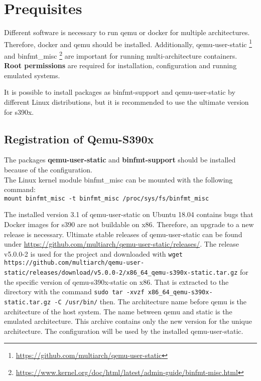 \chapter{Prequisites}\label{ch:prequisites}


Different software is necessary to run qemu or docker for multiple architectures. Therefore, docker and qemu should be installed. Additionally, qemu-user-static \footnote{\url{https://github.com/multiarch/qemu-user-static}} and binfmt\_misc \footnote{\url{https://www.kernel.org/doc/html/latest/admin-guide/binfmt-misc.html}} are important for running multi-architecture containers. \\
\textbf{Root permissions} are required for installation, configuration and running emulated systems.

It is possible to install packages as binfmt-support and qemu-user-static by different Linux distributions, but it is recommended to use the ultimate version for s390x. \\

\section{Registration of Qemu-S390x}\label{Qemu-S390-Registration}

The packages \textbf{qemu-user-static} and \textbf{binfmt-support} should be installed because of the configuration. \\

The Linux kernel module binfmt\_misc can be mounted with the following command: \\
\lstinline!mount binfmt_misc -t binfmt_misc /proc/sys/fs/binfmt_misc!

The installed version 3.1 of qemu-user-static on Ubuntu 18.04 contains bugs that Docker images for s390 are not buildable on x86. Therefore, an upgrade to a new release is necessary.
Ultimate stable releases of qemu-user-static can be found under \url{https://github.com/multiarch/qemu-user-static/releases/}. The release v5.0.0-2 is used for the project and downloaded with \lstinline!wget https://github.com/multiarch/qemu-user-static/releases/download/v5.0.0-2/x86_64_qemu-s390x-static.tar.gz! for the specific version of qemu-s390x-static on x86. That is extracted to the directory  with the command \lstinline!sudo tar -xvzf x86_64_qemu-s390x-static.tar.gz -C /usr/bin/! then. The architecture name before qemu is the architecture of the host system. The name between qemu and static is the emulated architecture. This archive contains only the new version for the unique architecture. The configuration will be used by the installed qemu-user-static.\\

